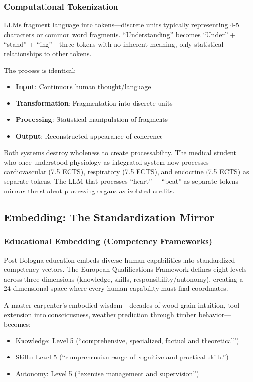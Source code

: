 \subsubsection{Computational Tokenization}

LLMs fragment language into tokens---discrete units typically representing 4-5 characters or common word fragments. ``Understanding'' becomes ``Under'' + ``stand'' + ``ing''---three tokens with no inherent meaning, only statistical relationships to other tokens.

The process is identical:
\begin{itemize}
\item \textbf{Input}: Continuous human thought/language
\item \textbf{Transformation}: Fragmentation into discrete units
\item \textbf{Processing}: Statistical manipulation of fragments
\item \textbf{Output}: Reconstructed appearance of coherence
\end{itemize}

Both systems destroy wholeness to create processability. The medical student who once understood physiology as integrated system now processes cardiovascular (7.5 ECTS), respiratory (7.5 ECTS), and endocrine (7.5 ECTS) as separate tokens. The LLM that processes ``heart'' + ``beat'' as separate tokens mirrors the student processing organs as isolated credits.

\subsection{Embedding: The Standardization Mirror}

\subsubsection{Educational Embedding (Competency Frameworks)}

Post-Bologna education embeds diverse human capabilities into standardized competency vectors. The European Qualifications Framework defines eight levels across three dimensions (knowledge, skills, responsibility/autonomy), creating a 24-dimensional space where every human capability must find coordinates.

A master carpenter's embodied wisdom---decades of wood grain intuition, tool extension into consciousness, weather prediction through timber behavior---becomes:
\begin{itemize}
\item Knowledge: Level 5 (``comprehensive, specialized, factual and theoretical'')
\item Skills: Level 5 (``comprehensive range of cognitive and practical skills'')
\item Autonomy: Level 5 (``exercise management and supervision'')
\end{itemize}

